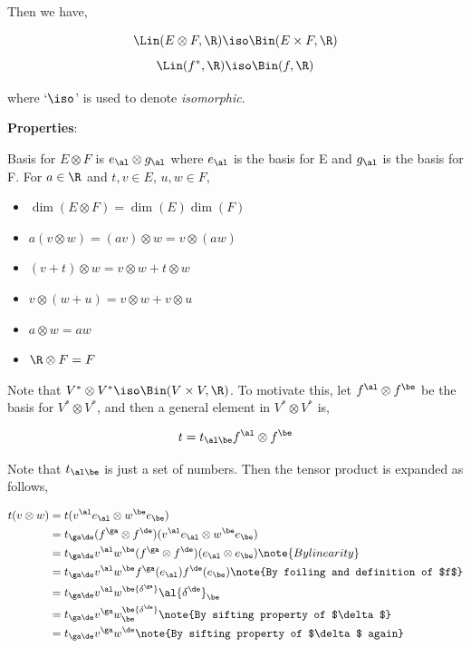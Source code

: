 \documentclass{article}
\newcommand{\heading}[1]{\vspace{0.1in}\textbf{#1}:}
\begin{document}
\begin{center}
\end{center}

Then we have,

\[ \Lin(E \otimes F, \R) \iso \Bin(E \times F, \R) \]
\[ \Lin(f^*, \R) \iso \Bin(f, \R) \]

where `$\iso$' is used to denote \textit{isomorphic}.

\heading{Properties}

Basis for $E \otimes F$ is $e_\al \otimes g_\al$ where $e_\al$ is the basis for E and $g_\al$ is the basis for F.
For $a \in \R$ and $t, v \in E$, $u, w \in F$,

\begin{itemize}
    \item $\dim(E \otimes F) = \dim(E)\dim(F)$
    \item $a (v \otimes w) = (av) \otimes w = v \otimes (aw)$
    \item $(v + t) \otimes w = v \otimes w + t \otimes w$
    \item $v \otimes (w + u) = v \otimes w + v \otimes u$
    \item $a \otimes w = aw$
    \item $\R \otimes F = F$
\end{itemize}

Note that $V^* \otimes V^* \iso \Bin(V \times V, \R)$. To motivate this, let $f^\al \otimes f^\be$ be the basis for $V^* \otimes V^*$, and then a general element in $V^* \otimes V^*$ is,

\[ t = t_{\al\be} f^\al \otimes f^\be \]

Note that $t_{\al\be}$ is just a set of numbers. Then the tensor product is expanded as follows,

\begin{align*}
    t (v \otimes w) &= t (v^\al e_\al \otimes w^\be e_\be) \\
    &= t_{\ga\de} (f^\ga \otimes f^\de) (v^\al e_\al \otimes w^\be e_\be) \\
    &= t_{\ga\de} v^\al w^\be (f^\ga \otimes f^\de) (e_\al \otimes e_\be) \note{By linearity} \\
    &= t_{\ga\de} v^\al w^\be f^\ga(e_\al) f^\de(e_\be) \note{By foiling and definition of $f$} \\
    &= t_{\ga\de} v^\al w^\be {\delta^\ga}\al {\delta^\de}_\be \\
    &= t_{\ga\de} v^\ga w^\be {\delta^\de}_\be \note{By sifting property of $\delta$}\\
    &= t_{\ga\de} v^\ga w^\de \note{By sifting property of $\delta$ again}
\end{align*}
\end{document}
